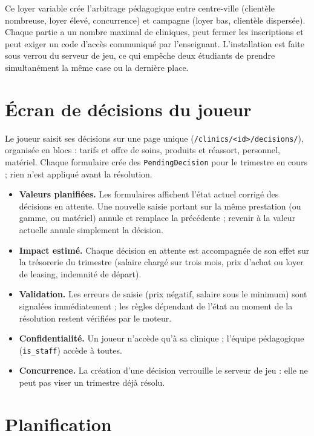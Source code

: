 \documentclass[11pt,a4paper]{article}
\newcommand{\code}[1]{\texttt{#1}}
\begin{document}
Ce loyer variable crée l'arbitrage pédagogique entre centre-ville (clientèle
nombreuse, loyer élevé, concurrence) et campagne (loyer bas, clientèle
dispersée). Chaque partie a un nombre maximal de cliniques, peut fermer les
inscriptions et peut exiger un code d'accès communiqué par l'enseignant.
L'installation est faite sous verrou du serveur de jeu, ce qui empêche deux
étudiants de prendre simultanément la même case ou la dernière place.

\section{Écran de décisions du joueur}

Le joueur saisit ses décisions sur une page unique
(\code{/clinics/<id>/decisions/}), organisée en blocs : tarifs et offre de
soins, produits et réassort, personnel, matériel. Chaque formulaire crée des
\code{PendingDecision} pour le trimestre en cours ; rien n'est appliqué
avant la résolution.

\begin{itemize}
  \item \textbf{Valeurs planifiées.} Les formulaires affichent l'état actuel
    corrigé des décisions en attente. Une nouvelle saisie portant sur la même
    prestation (ou gamme, ou matériel) annule et remplace la précédente ;
    revenir à la valeur actuelle annule simplement la décision.
  \item \textbf{Impact estimé.} Chaque décision en attente est accompagnée de
    son effet sur la trésorerie du trimestre (salaire chargé sur trois mois,
    prix d'achat ou loyer de leasing, indemnité de départ).
  \item \textbf{Validation.} Les erreurs de saisie (prix négatif, salaire
    sous le minimum) sont signalées immédiatement ; les règles dépendant de
    l'état au moment de la résolution restent vérifiées par le moteur.
  \item \textbf{Confidentialité.} Un joueur n'accède qu'à sa clinique ;
    l'équipe pédagogique (\code{is\_staff}) accède à toutes.
  \item \textbf{Concurrence.} La création d'une décision verrouille le
    serveur de jeu : elle ne peut pas viser un trimestre déjà résolu.
\end{itemize}

\section{Planification}
\end{document}

